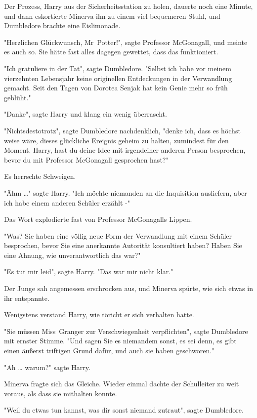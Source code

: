 {Der Prozess, Harry aus der Sicherheitsstation zu holen, dauerte noch eine Minute, und dann eskortierte Minerva ihn zu einem viel bequemeren Stuhl, und Dumbledore brachte eine Eislimonade.

"Herzlichen Glückwunsch, Mr~Potter!", sagte Professor McGonagall, und meinte es auch so. Sie hätte fast alles dagegen gewettet, dass das funktioniert.

"Ich gratuliere in der Tat", sagte Dumbledore. "Selbst ich habe vor meinem vierzehnten Lebensjahr keine originellen Entdeckungen in der Verwandlung gemacht. Seit den Tagen von Dorotea Senjak hat kein Genie mehr so früh geblüht."

"Danke", sagte Harry und klang ein wenig überrascht.

"Nichtsdestotrotz", sagte Dumbledore nachdenklich, "denke ich, dass es höchst weise wäre, dieses glückliche Ereignis geheim zu halten, zumindest für den Moment. Harry, hast du deine Idee mit irgendeiner anderen Person besprochen, bevor du mit Professor McGonagall gesprochen hast?"

Es herrschte Schweigen.

"Ähm …" sagte Harry. "Ich möchte niemanden an die Inquisition ausliefern, aber ich habe einem anderen Schüler erzählt -"

Das Wort explodierte fast von Professor McGonagalls Lippen.

"Was? Sie haben eine völlig neue Form der Verwandlung mit einem Schüler besprochen, bevor Sie eine anerkannte Autorität konsultiert haben? Haben Sie eine Ahnung, wie unverantwortlich das war?"

"Es tut mir leid", sagte Harry. "Das war mir nicht klar."

Der Junge sah angemessen erschrocken aus, und Minerva spürte, wie sich etwas in ihr entspannte.

Wenigstens verstand Harry, wie töricht er sich verhalten hatte.

"Sie müssen Miss~Granger zur Verschwiegenheit verpflichten", sagte Dumbledore mit ernster Stimme. "Und sagen Sie es niemandem sonst, es sei denn, es gibt einen äußerst triftigen Grund dafür, und auch sie haben geschworen."

"Ah … warum?" sagte Harry.

Minerva fragte sich das Gleiche. Wieder einmal dachte der Schulleiter zu weit voraus, als dass sie mithalten konnte.

"Weil du etwas tun kannst, was dir sonst niemand zutraut", sagte Dumbledore.

}
